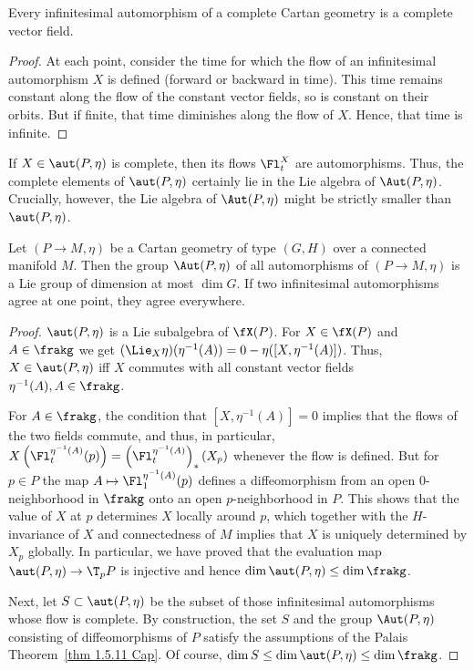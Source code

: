 \begin{prop}[Kobayashi (1957)]
    Every infinitesimal automorphism of a complete Cartan geometry is a complete vector field.
\end{prop}
\begin{proof}
    At each point, consider the time for which the flow of an infinitesimal automorphism $X$ is defined (forward or backward in time). This time remains constant along the flow of the constant vector fields, so is constant on their orbits. But if finite, that time diminishes along the flow of $X$. Hence, that time is infinite.
\end{proof}

If $X\in\aut(P,\eta)$ is complete, then its flows $\Fl^X_t$ are automorphisms. Thus, the complete elements of $\aut(P,\eta)$ certainly lie in the Lie algebra of $\Aut(P,\eta)$. Crucially, however, the Lie algebra of $\Aut(P,\eta)$ might be strictly smaller than $\aut(P,\eta)$.

\begin{thm}\label{thm 1.5.11 Cap}
    Let $(P\to M,\eta)$ be a Cartan geometry of type $(G,H)$ over a connected manifold $M$. Then the group $\Aut(P,\eta)$ of all automorphisms of $(P\to M,\eta)$ is a Lie group of dimension at most $\dim G$. If two infinitesimal automorphisms agree at one point, they agree everywhere.
\end{thm}
\begin{proof}
    $\aut(P,\eta)$ is a Lie subalgebra of $\fX(P)$. For $X\in\fX(P)$ and $A\in\frakg$ we get $(\Lie_X\eta)(\eta^{-1}(A))=0-\eta([X,\eta^{-1}(A)])$. Thus, $X\in\aut(P,\eta)$ iff $X$ commutes with all constant vector fields $\eta^{-1}(A),A\in\frakg$.

    For $A\in\frakg$, the condition that $[X,\eta^{-1}(A)]=0$ implies that the flows of the two fields commute, and thus, in particular, $X\left(\Fl_t^{\eta^{-1}(A)}(p)\right)=\left(\Fl_t^{\eta^{-1}(A)}\right)_\ast (X_p)$ whenever the flow is defined. But for $p\in P$ the map $A\mapsto \Fl_1^{\eta^{-1}(A)}(p)$ defines a diffeomorphism from an open $0$-neighborhood in $\frakg$ onto an open $p$-neighborhood in $P$. This shows that the value of $X$ at $p$ determines $X$ locally around $p$, which together with the $H$-invariance of $X$ and connectedness of $M$ implies that $X$ is uniquely determined by $X_p$ globally. In particular, we have proved that the evaluation map $\aut(P,\eta)\to \T_p P$ is injective and hence $\dim\aut(P,\eta)\leq \dim\frakg$.

    Next, let $S\subset\aut(P,\eta)$ be the subset of those infinitesimal automorphisms whose flow is complete. By construction, the set $S$ and the group $\Aut(P,\eta)$ consisting of diffeomorphisms of $P$ satisfy the assumptions of the Palais Theorem~\ref{thm 1.5.11 Cap}. Of course, $\dim S\leq\dim \aut(P,\eta)\leq\dim \frakg$.
\end{proof}

